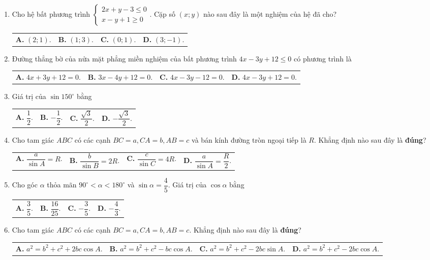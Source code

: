 \documentclass[12pt,a4paper]{article}
\makeatletter
\newcommand{\four}[4]{\par\noindent\begin{tabularx}{\linewidth}{@{}*{4}{>{\raggedright\arraybackslash}X}@{}}\textbf{A.} #1&\textbf{B.} #2&\textbf{C.} #3&\textbf{D.} #4\end{tabularx}}
\makeatother
\begin{document}
\begin{enumerate}
\item Cho hệ bất phương trình $\begin{cases} 2x + y - 3 \le 0 \\ x - y + 1 \ge 0 \end{cases}$. Cặp số $(x; y)$ nào sau đây là một nghiệm của hệ đã cho?
\four{$(2; 1)$.}{$(1; 3)$.}{$(0; 1)$.}{$(3; -1)$.}

\item Đường thẳng bờ của nửa mặt phẳng miền nghiệm của bất phương trình $4x - 3y + 12 \le 0$ có phương trình là
\four{$4x + 3y + 12 = 0$.}{$3x - 4y + 12 = 0$.}{$4x - 3y - 12 = 0$.}{$4x - 3y + 12 = 0$.}

\item Giá trị của $\sin 150^\circ$ bằng
\four{$\dfrac{1}{2}$.}{$-\dfrac{1}{2}$.}{$\dfrac{\sqrt{3}}{2}$.}{$-\dfrac{\sqrt{3}}{2}$.}

\item Cho tam giác $ABC$ có các cạnh $BC = a, CA = b, AB = c$ và bán kính đường tròn ngoại tiếp là $R$. Khẳng định nào sau đây là \textbf{đúng}?
\four{$\dfrac{a}{\sin A} = R$.}{$\dfrac{b}{\sin B} = 2R$.}{$\dfrac{c}{\sin C} = 4R$.}{$\dfrac{a}{\sin A} = \dfrac{R}{2}$.}

\item Cho góc $\alpha$ thỏa mãn $90^\circ < \alpha < 180^\circ$ và $\sin \alpha = \dfrac{4}{5}$. Giá trị của $\cos \alpha$ bằng
\four{$\dfrac{3}{5}$.}{$\dfrac{16}{25}$.}{$-\dfrac{3}{5}$.}{$-\dfrac{4}{3}$.}

\item Cho tam giác $ABC$ có các cạnh $BC = a, CA = b, AB = c$. Khẳng định nào sau đây là \textbf{đúng}?
\four{$a^2 = b^2 + c^2 + 2bc \cos A$.}{$a^2 = b^2 + c^2 - bc \cos A$.}{$a^2 = b^2 + c^2 - 2bc \sin A$.}{$a^2 = b^2 + c^2 - 2bc \cos A$.}
\end{enumerate}
\end{document}
